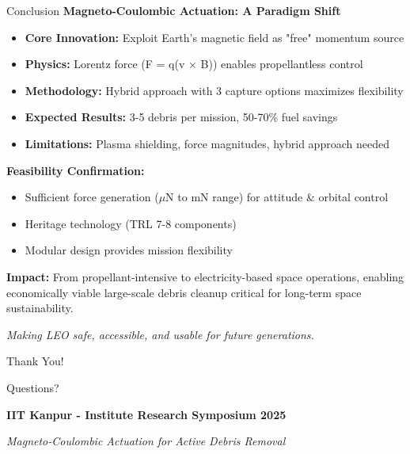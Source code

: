 \documentclass[aspectratio=169]{beamer}
\begin{document}
\begin{frame}{Conclusion}
\textbf{Magneto-Coulombic Actuation: A Paradigm Shift}

\vspace{0.3cm}
\begin{itemize}
    \item \textbf{Core Innovation:} Exploit Earth's magnetic field as "free" momentum source
    \item \textbf{Physics:} Lorentz force (F = q(v × B)) enables propellantless control
    \item \textbf{Methodology:} Hybrid approach with 3 capture options maximizes flexibility
    \item \textbf{Expected Results:} 3-5 debris per mission, 50-70\% fuel savings
    \item \textbf{Limitations:} Plasma shielding, force magnitudes, hybrid approach needed
\end{itemize}

\vspace{0.5cm}
\textbf{Feasibility Confirmation:}
\begin{itemize}
    \item Sufficient force generation ($\mu$N to mN range) for attitude \& orbital control
    \item Heritage technology (TRL 7-8 components)
    \item Modular design provides mission flexibility
\end{itemize}

\vspace{0.5cm}
\begin{center}
\colorbox{green!20}{\parbox{0.85\textwidth}{
\textbf{Impact:} From propellant-intensive to electricity-based space operations, enabling economically viable large-scale debris cleanup critical for long-term space sustainability.
}}
\end{center}

\vspace{0.3cm}
\begin{center}
\textit{Making LEO safe, accessible, and usable for future generations.}
\end{center}
\end{frame}

\begin{frame}{}
\begin{center}
{\Huge Thank You!}

\vspace{1cm}
{\Large Questions?}

\vspace{1.5cm}
\textbf{IIT Kanpur - Institute Research Symposium 2025}

\vspace{0.5cm}
\textit{Magneto-Coulombic Actuation for Active Debris Removal}
\end{center}
\end{frame}
\end{document}
